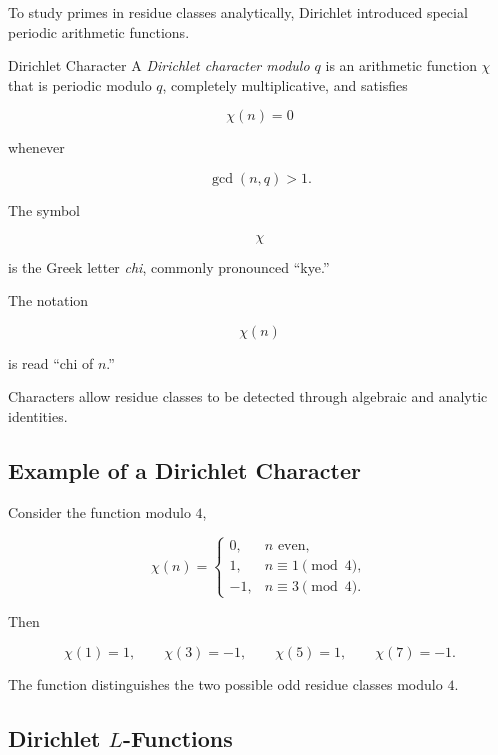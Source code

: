 To study primes in residue classes analytically, Dirichlet introduced special
periodic arithmetic functions.

\begin{definitionbox}{Dirichlet Character}
A \emph{Dirichlet character modulo \(q\)} is an arithmetic function
\(\chi\) that is periodic modulo \(q\), completely multiplicative, and
satisfies

\[ \chi(n)=0 \]

whenever

\[ \gcd(n,q)>1. \]
\end{definitionbox}

The symbol

\[ \chi \]

is the Greek letter \emph{chi}, commonly pronounced ``kye.''

The notation

\[ \chi(n) \]

is read ``chi of \(n\).''

Characters allow residue classes to be detected through algebraic and
analytic identities.

\subsection{Example of a Dirichlet Character}
\label{subsec:dirichlet-character-example}

Consider the function modulo \(4\),

\[
\chi(n)=
\begin{cases}
0, & n\text{ even},\\
1, & n\equiv1\pmod4,\\
-1, & n\equiv3\pmod4.
\end{cases}
\]

Then

\[ \chi(1)=1,\qquad\chi(3)=-1,\qquad\chi(5)=1,\qquad\chi(7)=-1. \]

The function distinguishes the two possible odd residue classes modulo \(4\).

\subsection{Dirichlet \(L\)-Functions}
\label{subsec:dirichlet-l-functions}

